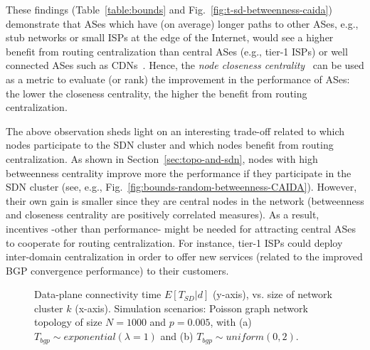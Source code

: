 These findings (Table~\ref{table:bounds} and Fig.~\ref{fig:t-sd-betweenness-caida}) demonstrate that ASes which have (on average) longer paths to other ASes, e.g., stub networks or small ISPs at the edge of the Internet, would see a higher benefit from routing centralization than central ASes (e.g., tier-1 ISPs) or well connected ASes such as CDNs~\cite{Chiu-One-Hop-Away-IMC-2015}. Hence, the \textit{node closeness centrality}~\cite{Newman:Networks-book} can be used as a metric to evaluate (or rank) the improvement in the performance of ASes: the lower the closeness centrality, the higher the benefit from routing centralization.

The above observation sheds light on an interesting trade-off related to which nodes participate to the SDN cluster and which nodes benefit from routing centralization. As shown in Section~\ref{sec:topo-and-sdn}, nodes with high betweenness centrality improve more the performance if they participate in the SDN cluster (see, e.g., Fig.~\ref{fig:bounds-random-betweenness-CAIDA}). However, their own gain is smaller since they are central nodes in the network (betweenness and closeness centrality are positively correlated measures). As a result, incentives -other than performance- might be needed for attracting central ASes to cooperate for routing centralization. For instance, tier-1 ISPs could deploy inter-domain centralization in order to offer new services (related to the improved BGP convergence performance) to their customers.



\begin{figure}
\centering
{}
\hspace{0.05\linewidth}
\caption{Data-plane connectivity time $E[T_{SD}|d]$ (y-axis), vs. size of network cluster $k$ (x-axis). Simulation scenarios: Poisson graph network topology of size $N=1000$ and $p=0.005$, with (a) $T_{bgp}\sim exponential(\lambda=1)$ and (b) $T_{bgp}\sim uniform(0,2)$.}
\label{fig:bounds}
\end{figure}

